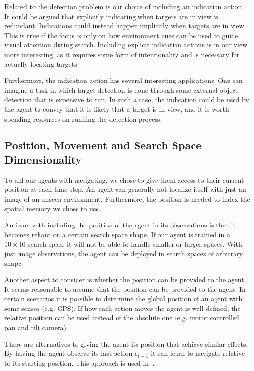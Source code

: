Related to the detection problem is our choice of including an indication action.
It could be argued that explicitly indicating when targets are in view is redundant.
Indications could instead happen implicitly when targets are in view.
This is true if the focus is only on how environment cues can be used to guide visual attention during search.
Including explicit indication actions is in our view more interesting, as it requires some form of intentionality and is necessary for actually locating targets.

Furthermore, the indication action has several interesting applications.
One can imagine a task in which target detection is done through some external object detection that is expensive to run.
In such a case, the indication could be used by the agent to convey that it is likely that a target is in view, and it is worth spending resources on running the detection process.

\subsection{Position, Movement and Search Space Dimensionality}

To aid our agents with navigating, we chose to give them access to their current position at each time step.
An agent can generally not localize itself with just an image of an unseen environment.
Furthermore, the position is needed to index the spatial memory we chose to use.

An issue with including the position of the agent in its observations is that it becomes reliant on a certain search space shape.
If our agent is trained in a \(10 \times 10\) search space it will not be able to handle smaller or larger spaces.
With just image observations, the agent can be deployed in search spaces of arbitrary shape.

Another aspect to consider is whether the position can be provided to the agent.
It seems reasonable to assume that the position can be provided to the agent.
In certain scenarios it is possible to determine the global position of an agent with some sensor (e.g. GPS).
If how each action moves the agent is well-defined, the relative position can be used instead of the absolute one (e.g. motor controlled pan and tilt camera).

There are alternatives to giving the agent its position that achieve similar effects.
By having the agent observe its last action \(a_{t-1}\) it can learn to navigate relative to its starting position.
This approach is used in~\cite{mirowski_learning_2017}.

